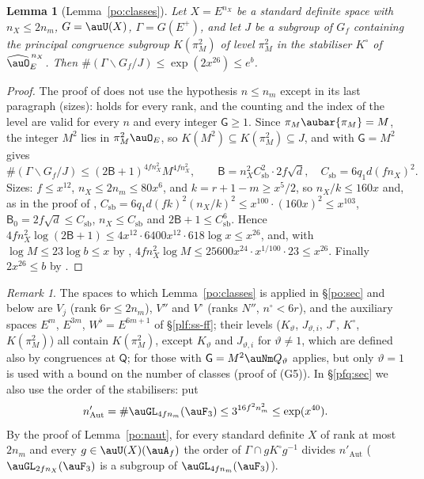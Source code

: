 \documentclass[10pt]{amsart}
\newtheorem{lemma}[theorem]{Lemma}
\theoremstyle{definition}
\theoremstyle{remark}
\newtheorem{remark}[theorem]{Remark}
\begin{document}
\begin{lemma}[Lemma~\ref{po:classes}]\label{plf:classes}
Let $X=E^{n_X}$ be a standard definite space with $n_X\le2n_m$, $G=\auU(X)$, $\Gamma=G(E^+)$, and
let $J$ be a subgroup of $G_f$ containing the principal congruence subgroup $K(\pi_M^2)$ of level
$\pi_M^2$ in the stabiliser $K^\circ$ of $\widehat\auO_E^{\,n_X}$. Then $\#(\Gamma\backslash G_f/J)\le
\exp(2x^{26})\le e^b$.
\end{lemma}
\begin{proof}
The proof of {\cite[Proposition~7.20]{P49}} does not use the hypothesis $n\le n_m$ except in its last
paragraph (sizes): {\cite[Lemma~14.21]{P46}} holds for every rank, and the counting and the index
of the level are valid for every $n$ and every integer $\mathsf G\ge1$. Since
$\pi_M\aubar{\pi_M}=M$, the integer $M^2$ lies in $\pi_M^2\auO_E$, so $K(M^2)\subseteq K(\pi_M^2)
\subseteq J$, and {\cite[Proposition~7.20]{P49}} with $\mathsf G=M^2$ gives
\[
\#(\Gamma\backslash G_f/J)\le(2\mathsf B+1)^{4fn_X^2}M^{4fn_X^2},\qquad\mathsf B=n_X^2C_{\mathrm{sb}}^2
\cdot2f\sqrt d,\quad C_{\mathrm{sb}}=6q_1d(fn_X)^2 .
\]
Sizes: $f\le x^{12}$, $n_X\le2n_m\le80x^6$, and $k=r+1-m\ge x^5/2$, so $n_X/k\le160x$ and, as in
the proof of {\cite[Proposition~7.20]{P49}}, $C_{\mathrm{sb}}=6q_1d(fk)^2(n_X/k)^2\le x^{100}\cdot
(160x)^2\le x^{103}$, $\mathsf B_0=2f\sqrt d\le C_{\mathrm{sb}}$, $n_X\le C_{\mathrm{sb}}$ and $2\mathsf
B+1\le C_{\mathrm{sb}}^6$. Hence $4fn_X^2\log(2\mathsf B+1)\le4x^{12}\cdot6400x^{12}\cdot618\log x\le
x^{26}$, and, with $\log M\le23\log b\le x$ by {\cite[(36) and~(38)]{P46}},
$4fn_X^2\log M\le25600x^{24}\cdot x^{1/100}\cdot23\le x^{26}$. Finally $2x^{26}\le b$ by
{\cite[(36)]{P46}}.
\end{proof}

\begin{remark}\label{plf:rem-classes}
The spaces to which Lemma~\ref{po:classes} is applied in \S\ref{po:sec} and below are $V_j$
(rank $6r\le2n_m$), $V''$ and $V^\circ$ (ranks $N''$, $n^\circ<6r$), and the auxiliary spaces
$E^m$, $E^{3m}$, $W^\flat=E^{6m+1}$ of \S\ref{plf:ss-ff}; their levels ($K_\vartheta$, $J_{\vartheta,i}$,
$J^\circ$, $K^\circ$, $K(\pi_M^2)$) all contain $K(\pi_M^2)$, except $K_\vartheta$ and $J_{\vartheta,i}$
for $\vartheta\ne1$, which are defined also by congruences at $\mathsf Q$; for those
{\cite[Proposition~7.20]{P49}} with $\mathsf G=M^2\auNm Q_\vartheta$ applies, but only $\vartheta=1$ is
used with a bound on the number of classes (proof of (G5)). In \S\ref{pfq:sec} we also use the
order of the stabilisers: put
\[
n'_{\mathrm{Aut}}=\#\auGL_{4fn_m}(\auF_3)\le3^{16f^2n_m^2}\le\exp(x^{40}).
\]
By the proof of Lemma~\ref{po:naut}, for every standard definite $X$ of rank at most $2n_m$ and
every $g\in\auU(X)(\auA_f)$ the order of $\Gamma\cap gK^\circ g^{-1}$ divides $n'_{\mathrm{Aut}}$
($\auGL_{2fn_X}(\auF_3)$ is a subgroup of $\auGL_{4fn_m}(\auF_3)$).
\end{remark}
\end{document}
